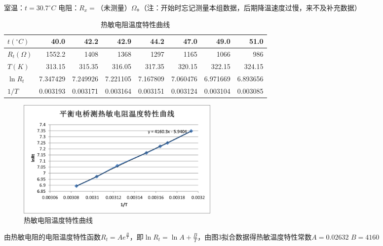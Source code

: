 \documentclass[11pt]{article}
\begin{document}
\begin{enumerate}
\begin{figure}[H]
            
        \end{figure}
        \begin{table}[H]
          \centering
          \caption{热敏电阻温度特性曲线}
          室温：$t=30.7^{\circ}C$ \quad 电阻：$R_{x}=$（未测量）$\Omega$。（注：开始时忘记测量本组数据，后期降温速度过慢，来不及补充数据）
            \begin{center}
                \begin{tabular}{|l|r|r|r|r|r|r|r|}\hline
                    $t(^{\circ}C)$   & 40.0    & 42.2  & 42.9  & 44.2  & 47.0    & 49.0    & 51.0 \\\hline
                    $R_{t}(\Omega)$   & 1552.2 & 1408  & 1368  & 1297  & 1165  & 1066  & 986 \\\hline
                    $T(K)$     & 313.15 & 315.35 & 316.05 & 317.35 & 320.15 & 322.15 & 324.15 \\\hline
                    $\ln R_{t}$  & 7.347429 & 7.249926 & 7.221105 & 7.167809 & 7.060476 & 6.971669 & 6.893656 \\\hline
                    $1/T$   & 0.003193 & 0.003171 & 0.003164 & 0.003151 & 0.003124 & 0.003104 & 0.003085 \\\hline
                \end{tabular}%
            \end{center}
        \end{table}%
        \begin{figure}[H]
            \centering
            \includegraphics[width=10cm]{Fig/3.png}
            \caption{热敏电阻温度特性曲线}
        \end{figure}
        由热敏电阻的电阻温度特性函数$R_{t}=Ae^{\frac{B}{T}}$，即$\ln R_{t}=\ln A+\frac{B}{T}$，由图3拟合数据得热敏温度特性常数$A=0.02632$ \qquad $B=4160$
   
\end{enumerate}
    
\end{document}
